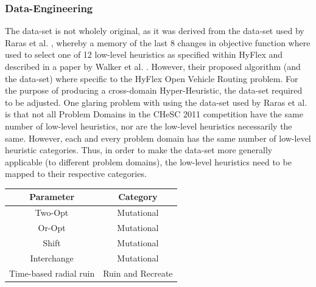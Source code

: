 \documentclass[a4paper,12pt]{article}
\begin{document}
        \subsubsection*{Data-Engineering}
            \par{
                The data-set is not wholely original, as it was derived from the data-set used by Raras et al. \cite{tdnn}, whereby a memory of the last 8 changes in objective 
                function where used to select one of 12 low-level heuristics as specified within HyFlex and described in a paper by Walker et al. \cite{ILS}. However, their proposed algorithm (and the data-set) where specific to the HyFlex Open Vehicle Routing 
                problem. For the purpose of producing a cross-domain Hyper-Heuristic, the data-set required to be adjusted.\newline 
                \newline 
                One glaring problem with using the data-set used by Raras et al. \cite{tdnn} is that not all Problem Domains in the CHeSC 2011 competition have the same number
                of low-level heuristics, nor are the low-level heuristics necessarily the same. However, each and every problem domain has the same number of 
                low-level heuristic categories. Thus, in order to make the data-set more generally applicable (to different problem domains), the low-level heuristics need to be 
                mapped to their respective categories. 
                \newline
                \begin{table}[ht]
                    \centering
                        \small 
                        \begin{tabular}{ | c | c | } 
                            \hline
                            \textbf{Parameter} & \textbf{Category} \\
                            \hline  
                            Two-Opt & Mutational \\
                            \hline 
                            Or-Opt & Mutational \\
                            \hline 
                            Shift & Mutational \\
                            \hline 
                            Interchange & Mutational \\
                            \hline 
                            Time-based radial ruin & Ruin and Recreate \\

\end{tabular}
\end{table}}
\end{document}

